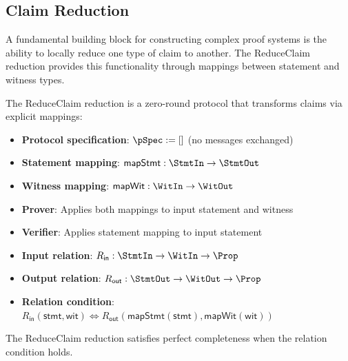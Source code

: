 \subsection{Claim Reduction}

A fundamental building block for constructing complex proof systems is the ability to locally reduce one type of claim to another. The ReduceClaim reduction provides this functionality through mappings between statement and witness types.

\begin{definition}
    \label{def:reduceclaim_reduction}
    The ReduceClaim reduction is a zero-round protocol that transforms claims via explicit mappings:
    \begin{itemize}
        \item \textbf{Protocol specification}: $\pSpec := []$ (no messages exchanged)
        \item \textbf{Statement mapping}: $\mathsf{mapStmt} : \StmtIn \to \StmtOut$
        \item \textbf{Witness mapping}: $\mathsf{mapWit} : \WitIn \to \WitOut$
        \item \textbf{Prover}: Applies both mappings to input statement and witness
        \item \textbf{Verifier}: Applies statement mapping to input statement
        \item \textbf{Input relation}: $R_{\mathsf{in}} : \StmtIn \to \WitIn \to \Prop$
        \item \textbf{Output relation}: $R_{\mathsf{out}} : \StmtOut \to \WitOut \to \Prop$
        \item \textbf{Relation condition}: $R_{\mathsf{in}}(\mathsf{stmt}, \mathsf{wit}) \iff R_{\mathsf{out}}(\mathsf{mapStmt}(\mathsf{stmt}), \mathsf{mapWit}(\mathsf{wit}))$
    \end{itemize}
\end{definition}

\begin{theorem}
    The ReduceClaim reduction satisfies perfect completeness when the relation condition holds.
\end{theorem}

